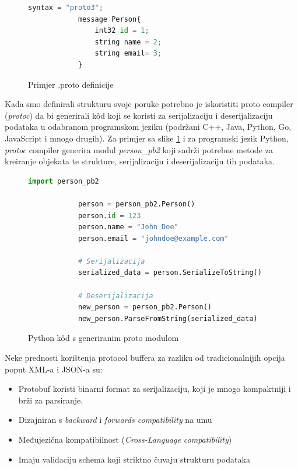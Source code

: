 \documentclass[zavrsnirad]{fer}
\begin{document}
\begin{figure}[H]
	\centering
	\begin{minipage}{0.6\linewidth}
		\begin{lstlisting}[language=Python]
			syntax = "proto3";
			message Person{
				int32 id = 1;
				string name = 2;
				string email= 3;
			}
		\end{lstlisting}
	\end{minipage}
	\caption{Primjer .proto definicije}
	\label{slk:proto}
\end{figure}		


	Kada smo definirali strukturu svoje poruke potrebno je iskoristiti proto compiler (\textit{protoc}) da bi generirali k\^od koji se koristi za serijalizaciju i deserijalizaciju podataka u odabranom programskom jeziku (podržani C++, Java, Python, Go, JavaScript i mnogo drugih). Za primjer sa slike \ref{slk:proto} i za programski jezik Python, \textit{protoc} compiler generira modul \textit{person\_pb2} koji sadrži potrebne metode za kreiranje objekata te strukture, serijalizaciju i deserijalizaciju tih podataka. 

\begin{figure}[H]
	\centering
	\begin{minipage}{0.8\linewidth}
		\begin{lstlisting}[language=Python]
			import person_pb2
			
			person = person_pb2.Person()
			person.id = 123
			person.name = "John Doe"
			person.email = "johndoe@example.com"
			
			# Serijalizacija
			serialized_data = person.SerializeToString()
			
			# Deserijalizacija
			new_person = person_pb2.Person()
			new_person.ParseFromString(serialized_data)
		\end{lstlisting}
	\end{minipage}
	\caption{Python k\^od s generiranim proto modulom}
	\label{slk:proto_kod}
\end{figure}

Neke prednosti korištenja protocol buffera za razliku od tradicionalnijih opcija poput XML-a i JSON-a su:

\begin{itemize}
	\item Protobuf koristi binarni format za serijalizaciju, koji je mnogo kompaktniji i brži za parsiranje.
	\item Dizajniran s \textit{backward} i \textit{forwards compatibility} na umu 
	\item Međujezična kompatibilnost (\textit{Cross-Language compatibility})
	\item Imaju validaciju schema koji striktno čuvaju strukturu podataka
\end{itemize}
\end{document}
